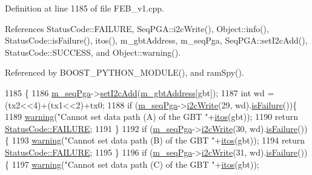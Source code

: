 Definition at line 1185 of file F\+E\+B\+\_\+v1.\+cpp.



References Status\+Code\+::\+F\+A\+I\+L\+U\+RE, Seq\+P\+G\+A\+::i2c\+Write(), Object\+::info(), Status\+Code\+::is\+Failure(), itos(), m\+\_\+gbt\+Address, m\+\_\+seq\+Pga, Seq\+P\+G\+A\+::set\+I2c\+Add(), Status\+Code\+::\+S\+U\+C\+C\+E\+SS, and Object\+::warning().



Referenced by B\+O\+O\+S\+T\+\_\+\+P\+Y\+T\+H\+O\+N\+\_\+\+M\+O\+D\+U\+L\+E(), and ram\+Spy().


\begin{DoxyCode}
1185                                                                    \{
1186   \hyperlink{classFEB__v1_a6c7804ac86796f233a8393043adf2e77}{m\_seqPga}->\hyperlink{classSeqPGA_a4ef334e4d2cb417b49033dce951728cd}{setI2cAdd}(\hyperlink{classFEB__v1_ac625855df976f16694178f1a4c0eef1e}{m\_gbtAddress}[gbt]);
1187   \textcolor{keywordtype}{int} wd = (tx2<<4)+(tx1<<2)+tx0; 
1188   \textcolor{keywordflow}{if} (\hyperlink{classFEB__v1_a6c7804ac86796f233a8393043adf2e77}{m\_seqPga}->\hyperlink{classSeqPGA_a429076ca3a4ece94182bd95c623bb9d0}{i2cWrite}(29, wd).\hyperlink{classStatusCode_a5dd22dc6eb2c52fc4cabc58f6dea2eb7}{isFailure}())\{
1189     \hyperlink{classObject_a65cd4fda577711660821fd2cd5a3b4c9}{warning}(\textcolor{stringliteral}{"Cannot set data path (A) of the GBT "}+\hyperlink{Tools_8h_af330027dbdafb9a30768b3613c553e60}{itos}(gbt));
1190     \textcolor{keywordflow}{return} \hyperlink{classStatusCode_a6f565cbeadc76d14c72f047e5e85eb4ba3da73d4c469762eb9d3c960368252b26}{StatusCode::FAILURE};
1191   \}
1192   \textcolor{keywordflow}{if} (\hyperlink{classFEB__v1_a6c7804ac86796f233a8393043adf2e77}{m\_seqPga}->\hyperlink{classSeqPGA_a429076ca3a4ece94182bd95c623bb9d0}{i2cWrite}(30, wd).\hyperlink{classStatusCode_a5dd22dc6eb2c52fc4cabc58f6dea2eb7}{isFailure}())\{
1193     \hyperlink{classObject_a65cd4fda577711660821fd2cd5a3b4c9}{warning}(\textcolor{stringliteral}{"Cannot set data path (B) of the GBT "}+\hyperlink{Tools_8h_af330027dbdafb9a30768b3613c553e60}{itos}(gbt));
1194     \textcolor{keywordflow}{return} \hyperlink{classStatusCode_a6f565cbeadc76d14c72f047e5e85eb4ba3da73d4c469762eb9d3c960368252b26}{StatusCode::FAILURE};
1195   \}
1196   \textcolor{keywordflow}{if} (\hyperlink{classFEB__v1_a6c7804ac86796f233a8393043adf2e77}{m\_seqPga}->\hyperlink{classSeqPGA_a429076ca3a4ece94182bd95c623bb9d0}{i2cWrite}(31, wd).\hyperlink{classStatusCode_a5dd22dc6eb2c52fc4cabc58f6dea2eb7}{isFailure}())\{
1197     \hyperlink{classObject_a65cd4fda577711660821fd2cd5a3b4c9}{warning}(\textcolor{stringliteral}{"Cannot set data path (C) of the GBT "}+\hyperlink{Tools_8h_af330027dbdafb9a30768b3613c553e60}{itos}(gbt));

\end{DoxyCode}
